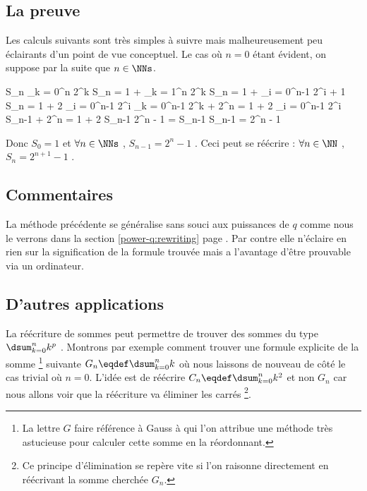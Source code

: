 \subsection{La preuve}

Les calculs suivants sont très simples à suivre mais malheureusement peu éclairants d'un point de vue conceptuel. Le cas où $n = 0$ étant évident, on suppose par la suite que $n \in \NNs$.

\medskip

\begin{explain}[style = sar, ope = \iff]
	S_n \eqdef \dsum_{k = 0}^{n} 2^k
		\explnext{}
	S_n = 1 + \dsum_{k = 1}^{n} 2^k
	S_n = 1 + \dsum_{i = 0}^{n-1} 2^{i + 1}
		\explnext{}
	S_n = 1 + 2 \dsum_{i = 0}^{n-1} 2^i
	\dsum_{k = 0}^{n-1} 2^k + 2^n = 1 + 2 \dsum_{i = 0}^{n-1} 2^i
		\explnext{}
	S_{n-1} + 2^n = 1 + 2 S_{n-1}
		\explnext{}
	2^n - 1 = S_{n-1}
		\explnext{}
	S_{n-1} = 2^n - 1
\end{explain}

\bigskip

Donc $S_0 = 1$ et $\forall n \in \NNs$ , $S_{n-1} = 2^n - 1$ .
Ceci peut se réécrire :
$\forall n \in \NN$ , $S_n = 2^{n+1} - 1$ .




\subsection{Commentaires}

La méthode précédente se généralise sans souci aux puissances de $q$ comme nous le verrons dans la section \ref{power-q:rewriting} page \pageref{power-q:rewriting}.
Par contre elle n'éclaire en rien sur la signification de la formule trouvée mais a l'avantage d'être prouvable via un ordinateur.




\subsection{D'autres applications}

La réécriture de sommes peut permettre de trouver des sommes du type $\dsum_{k = 0}^{n} k^p$ .
Montrons par exemple comment trouver une formule explicite de la somme
\footnote{
	La lettre $G$ faire référence à Gauss à qui l'on attribue une méthode très astucieuse pour calculer cette somme en la réordonnant.
}
suivante $G_n \eqdef \dsum_{k = 0}^{n} k$ où nous laissons de nouveau de côté le cas trivial où $n = 0$.
L'idée est de réécrire $C_n \eqdef \dsum_{k = 0}^{n} k^2$ et non $G_n$ car nous allons voir que la réécriture va éliminer les carrés
\footnote{
	Ce principe d'élimination se repère vite si l'on raisonne directement en réécrivant la somme cherchée $G_n$.
}.

